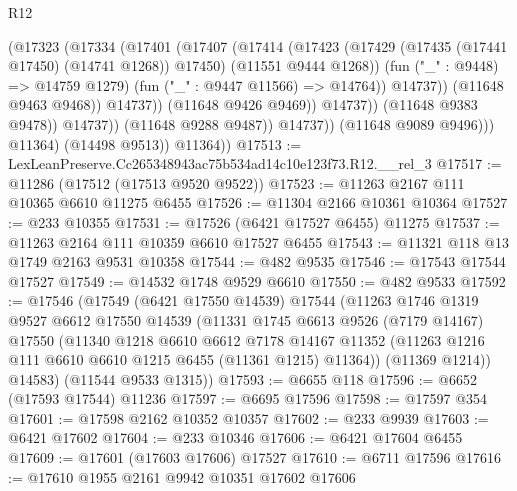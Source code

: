 \begin{lexlean}{R12}
\begin{coremodule}
                                    (@17323
                                      (@17334
                                        (@17401
                                          (@17407
                                            (@17414
                                              (@17423
                                                (@17429
                                                  (@17435 (@17441 @17450) (@14741 @1268))
                                                  @17450)
                                                (@11551 @9444 @1268))
                                              (fun ("_" : @9448) => @14759 @1279)
                                              (fun ("_" : @9447 @11566) => @14764))
                                            @14737))
                                        (@11648 @9463 @9468))
                                      @14737))
                                  (@11648 @9426 @9469))
                                @14737))
                            (@11648 @9383 @9478))
                          @14737))
                      (@11648 @9288 @9487))
                    @14737))
                (@11648 @9089 @9496)))
            @11364)
          (@14498 @9513))
        @11364))
@17513 := LexLeanPreserve.Cc265348943ac75b534ad14c10e123f73.R12.__rel_3
@17517 := @11286 (@17512 (@17513 @9520 @9522))
@17523 := @11263 @2167 @111 @10365 @6610 @11275 @6455
@17526 := @11304 @2166 @10361 @10364
@17527 := @233 @10355
@17531 := @17526 (@6421 @17527 @6455) @11275
@17537 := @11263 @2164 @111 @10359 @6610 @17527 @6455
@17543 := @11321 @118 @13 @1749 @2163 @9531 @10358
@17544 := @482 @9535
@17546 := @17543 @17544 @17527
@17549 := @14532 @1748 @9529 @6610
@17550 := @482 @9533
@17592 := @17546
    (@17549
      (@6421 @17550 @14539)
      @17544
      (@11263
        @1746
        @1319
        @9527
        @6612
        @17550
        @14539
        (@11331
          @1745
          @6613
          @9526
          (@7179 @14167)
          @17550
          (@11340
            @1218
            @6610
            @6612
            @7178
            @14167
            @11352
            (@11263 @1216 @111 @6610 @6610 @1215 @6455 (@11361 @1215) @11364))
          (@11369 @1214))
        @14583)
      (@11544 @9533 @1315))
@17593 := @6655 @118
@17596 := @6652 (@17593 @17544) @11236
@17597 := @6695 @17596
@17598 := @17597 @354
@17601 := @17598 @2162 @10352 @10357
@17602 := @233 @9939
@17603 := @6421 @17602
@17604 := @233 @10346
@17606 := @6421 @17604 @6455
@17609 := @17601 (@17603 @17606) @17527
@17610 := @6711 @17596
@17616 := @17610 @1955 @2161 @9942 @10351 @17602 @17606

\end{coremodule}
\end{lexlean}
